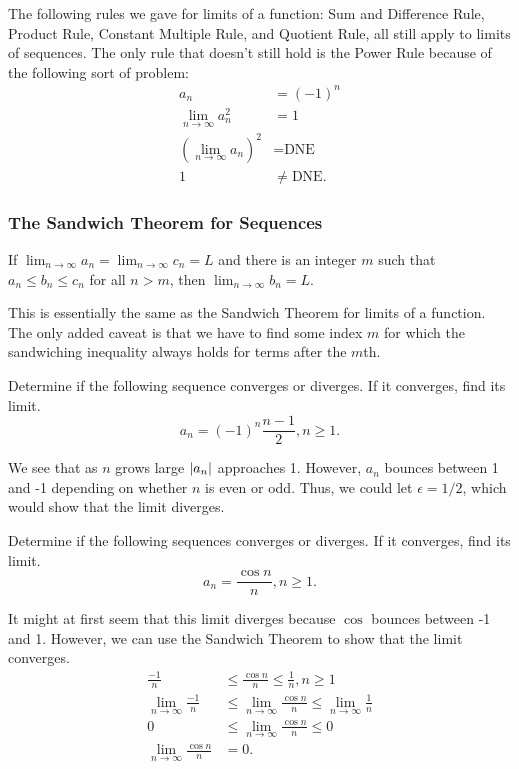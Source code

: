 \noindent
The following rules we gave for limits of a function: Sum and Difference Rule, Product Rule, Constant Multiple Rule, and Quotient Rule, all still apply to limits of sequences.
The only rule that doesn't still hold is the Power Rule because of the following sort of problem:
\begin{align*}
	a_n &= (-1)^n \\
	\lim_{n\to\infty}{a_n^2} &= 1 \\
	\left(\lim_{n\to\infty}{a_n}\right)^2 &= \text{DNE} \\
	1 &\neq \text{DNE}.
\end{align*}

\subsubsection{The Sandwich Theorem for Sequences}
\begin{theorem}
	If $\lim_{n\to\infty}{a_n} = \lim_{n\to\infty}{c_n} = L$ and there is an integer $m$ such that $a_n \leq b_n \leq c_n$ for all $n > m$, then $\lim_{n\to\infty}{b_n} = L$.
\end{theorem}
\noindent
This is essentially the same as the Sandwich Theorem for limits of a function.
The only added caveat is that we have to find some index $m$ for which the sandwiching inequality always holds for terms after the $m$th.

\begin{example}
	Determine if the following sequence converges or diverges.
	If it converges, find its limit.
	\begin{equation*}
		a_n = (-1)^n\frac{n-1}{2}, n\geq 1.
	\end{equation*}
\end{example}
We see that as $n$ grows large $\lvert a_n \rvert$ approaches 1.
However, $a_n$ bounces between 1 and -1 depending on whether $n$ is even or odd.
Thus, we could let $\epsilon = 1/2$, which would show that the limit diverges.

\begin{example}
	Determine if the following sequences converges or diverges.
	If it converges, find its limit.
	\begin{equation*}
		a_n = \frac{\cos{n}}{n}, n\geq 1.
	\end{equation*}
\end{example}
It might at first seem that this limit diverges because $\cos$ bounces between -1 and 1.
However, we can use the Sandwich Theorem to show that the limit converges.
\begin{align*}
	\frac{-1}{n} &\leq \frac{\cos{n}}{n} \leq \frac{1}{n}, n\geq 1 \\
	\lim_{n\to\infty}{\frac{-1}{n}} &\leq \lim_{n\to\infty}{\frac{\cos{n}}{n}} \leq \lim_{n\to\infty}{\frac{1}{n}} \\
	0 &\leq \lim_{n\to\infty}{\frac{\cos{n}}{n}} \leq 0 \\
	\lim_{n\to\infty}{\frac{\cos{n}}{n}} &= 0.
\end{align*}

